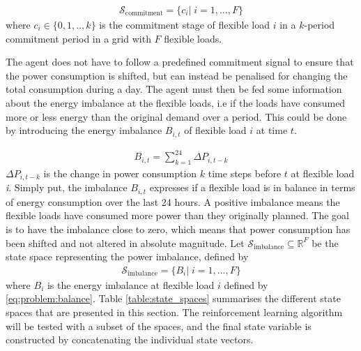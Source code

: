 \documentclass[class=book, crop=false, 11pt]{standalone}
\begin{document}
\begin{equation}
   \begin{aligned}
   \label{eq:problem:commitment_state}
\mathcal{S}_{\textrm{commitment}} = \{ c_{i} | \;i = 1,...,F\}
    \end{aligned} 
\end{equation}
where $c_{i} \in \{0,1,..,k\}$ is the commitment stage of flexible load $i$ in a $k$-period commitment period in a grid with $F$ flexible loads.

The agent does not have to follow a predefined commitment signal to ensure that the power consumption is shifted, but can instead be penalised for changing the total consumption during a day. The agent must then be fed some information about the energy imbalance at the flexible loads, i.e if the loads have consumed more or less energy than the original demand over a period. This could be done by introducing the energy imbalance $B_{i,t}$ of flexible load $i$ at time $t$.

\begin{equation}
   \begin{aligned}
   \label{eq:problem:balance}
    B_{i,t} = \sum_{k=1}^{24}\Delta P_{i,t-k}
    \end{aligned} 
\end{equation}
$\Delta P_{i,t-k}$ is the change in power consumption $k$ time steps before $t$ at flexible load \textit{i}. Simply put, the imbalance $B_{i,t}$ expresses if a flexible load is in balance in terms of energy consumption over the last 24 hours. A positive imbalance means the flexible loads have consumed more power than they originally planned. The goal is to have the imbalance close to zero, which means that power consumption has been shifted and not altered in absolute magnitude. Let $\mathcal{S}_{\textrm{imbalance}} \subseteq \mathbb{R}^{F}$  be the state space representing the power imbalance, defined by 
\begin{equation}
   \begin{aligned}
   \label{eq:problem:imbalance_state}
\mathcal{S}_{\textrm{imbalance}} = \{ B_{i} |\; i = 1,...,F\}
    \end{aligned} 
\end{equation}
where $B_{i}$ is the energy imbalance at flexible load $i$ defined by \eqref{eq:problem:balance}. Table \ref{table:state_spaces} summarises the different state spaces that are presented in this section. The reinforcement learning algorithm will be tested with a subset of the spaces, and the final state variable is constructed by concatenating the individual state vectors.  
\end{document}
